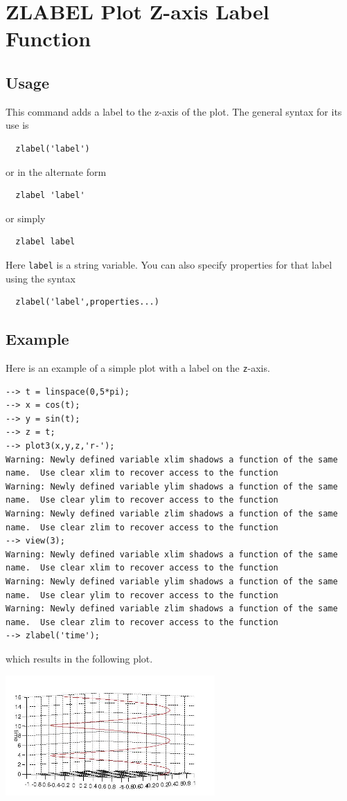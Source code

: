 \section{ZLABEL Plot Z-axis Label Function}

\subsection{Usage}

This command adds a label to the z-axis of the plot.  The general syntax
for its use is
\begin{verbatim}
  zlabel('label')
\end{verbatim}
or in the alternate form
\begin{verbatim}
  zlabel 'label'
\end{verbatim}
or simply
\begin{verbatim}
  zlabel label
\end{verbatim}
Here \verb|label| is a string variable.  You can also specify properties
for that label using the syntax
\begin{verbatim}
  zlabel('label',properties...) 
\end{verbatim}
\subsection{Example}

Here is an example of a simple plot with a label on the \verb|z|-axis.
\begin{verbatim}
--> t = linspace(0,5*pi);
--> x = cos(t);
--> y = sin(t);
--> z = t;
--> plot3(x,y,z,'r-');
Warning: Newly defined variable xlim shadows a function of the same name.  Use clear xlim to recover access to the function
Warning: Newly defined variable ylim shadows a function of the same name.  Use clear ylim to recover access to the function
Warning: Newly defined variable zlim shadows a function of the same name.  Use clear zlim to recover access to the function
--> view(3);
Warning: Newly defined variable xlim shadows a function of the same name.  Use clear xlim to recover access to the function
Warning: Newly defined variable ylim shadows a function of the same name.  Use clear ylim to recover access to the function
Warning: Newly defined variable zlim shadows a function of the same name.  Use clear zlim to recover access to the function
--> zlabel('time');
\end{verbatim}
which results in the following plot.


\centerline{\includegraphics[width=8cm]{zlabel1}}

